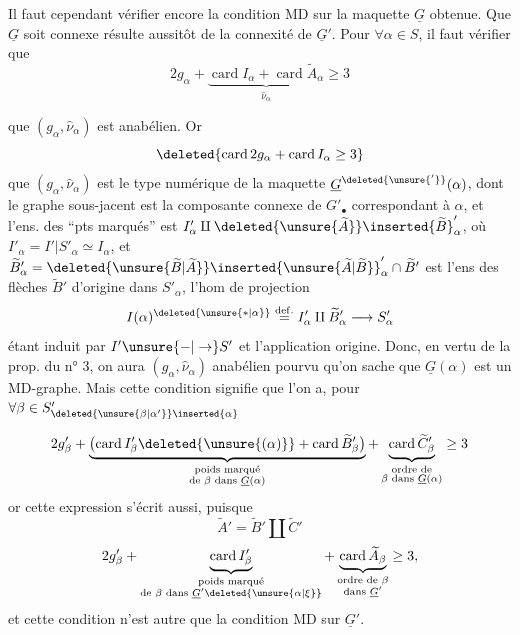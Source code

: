 Il faut cependant vérifier encore la condition MD sur la maquette $\underline G$ obtenue. Que $\underline G$ soit connexe résulte aussitôt de la connexité de $\underline G'$. Pour $\forall\alpha\in S$, il faut vérifier que
\[
2g_\alpha+\underbrace{\operatorname{card}I_\alpha+\operatorname{card}\widetilde A_\alpha}_{\widehat\nu_\alpha}\geq3
\]

 que $(g_\alpha,\widehat\nu_\alpha)$ est anabélien. Or
\[
\deleted{\operatorname{card}2g_\alpha+\operatorname{card}I_\alpha\geq3}
\]
 que $(g_\alpha,\widehat\nu_\alpha)$ est le type numérique de la maquette $\underline G^{\deleted{\unsure{'}}}(\alpha)$, dont le graphe sous-jacent est la composante connexe de $G'_\bullet$ correspondant à $\alpha$, et l'ens. des ``pts marqués'' est $I'_\alpha\amalg\deleted{\unsure{\widetilde A}}\inserted{\widetilde B}'_\alpha$,  où $I'_\alpha=I'|S'_\alpha\simeq I_\alpha$, et $\widetilde B'_\alpha=\deleted{\unsure{\widetilde B|\widetilde A}}\inserted{\unsure{\widetilde A|\widetilde B}}'_\alpha\cap\widetilde B'$ est l'ens des flèches  $\widetilde B'$ d'origine dans $S'_\alpha$, l'hom de projection
\[
I(\alpha)^{\deleted{\unsure{\ast|\alpha}}}\overset{\mathrm{def.}}{=}I'_\alpha\amalg\widetilde B'_\alpha\longrightarrow S'_\alpha
\]
étant induit par $I'\unsure{{-}|\to}S'$ et l'application origine. Donc, en vertu de la prop. du n° 3, on aura $(g_\alpha,\widehat\nu_\alpha)$ anabélien pourvu qu'on sache que $\underline G(\alpha)$ est un MD-graphe. Mais cette condition signifie que l'on a, pour $\forall\beta\in S'_{\deleted{\unsure{\beta|\alpha'}}\inserted{\alpha}}$

\[
2g'_\beta+\underbrace{\bigl(\operatorname{card}I'_\beta\deleted{\unsure{(\alpha)}}+\operatorname{card}\widetilde B'_\beta\bigr)}_{\substack{\text{poids marqué}\\\text{de }\beta\text{ dans }\underline G(\alpha)}}+\underbrace{\operatorname{card}\widetilde C'_\beta}_{\substack{\text{ordre de}\\\beta\text{ dans }\underline G(\alpha)}}\geq3
\]
or cette expression s'écrit aussi, puisque
\[
\widetilde A'=\widetilde B'\amalg\widetilde C'
\]
\[
2g'_\beta+\underbrace{\operatorname{card}I'_\beta}_{\substack{\text{poids marqué}\\\text{de }\beta\text{ dans }\underline G'\deleted{\unsure{\alpha|\xi}}}}+\underbrace{\operatorname{card}\widetilde A_\beta}_{\substack{\text{ordre de }\beta\\\text{dans }\underline G'}}\geq3,
\]
et cette condition n'est autre que la condition  MD sur $\underline G'$.

